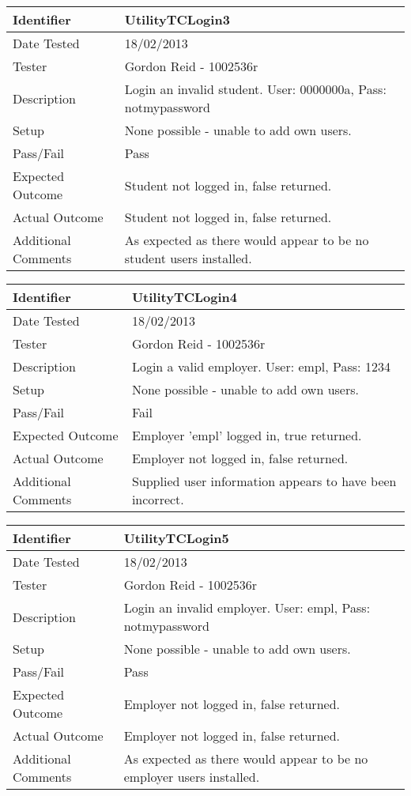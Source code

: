 \documentclass[11pt]{l3deliverable}
\begin{document}
\begin{tabularx}{\textwidth}{|T|L|}
\hline
Identifier & UtilityTCLogin3\\
\hline
Date Tested & 18/02/2013\\
\hline
Tester & Gordon Reid - 1002536r\\
\hline
Description & Login an invalid student. User: 0000000a, Pass: notmypassword\\
\hline
Setup & None possible - unable to add own users.\\
\hline
Pass/Fail & Pass\\
\hline
Expected Outcome & Student not logged in, false returned.\\
\hline
Actual Outcome & Student not logged in, false returned.\\
\hline
Additional Comments & As expected as there would appear to be no student users installed.\\
\hline
\end{tabularx}

\vspace{2em}

\begin{tabularx}{\textwidth}{|T|L|}
\hline
Identifier & UtilityTCLogin4\\
\hline
Date Tested & 18/02/2013\\
\hline
Tester & Gordon Reid - 1002536r\\
\hline
Description & Login a valid employer. User: empl, Pass: 1234\\
\hline
Setup & None possible - unable to add own users.\\
\hline
Pass/Fail & Fail\\
\hline
Expected Outcome & Employer 'empl' logged in, true returned.\\
\hline
Actual Outcome & Employer not logged in, false returned.\\
\hline
Additional Comments & Supplied user information appears to have been incorrect.\\
\hline
\end{tabularx}

\vspace{2em}

\begin{tabularx}{\textwidth}{|T|L|}
\hline
Identifier & UtilityTCLogin5\\
\hline
Date Tested & 18/02/2013\\
\hline
Tester & Gordon Reid - 1002536r\\
\hline
Description & Login an invalid employer. User: empl, Pass: notmypassword\\
\hline
Setup & None possible - unable to add own users.\\
\hline
Pass/Fail & Pass\\
\hline
Expected Outcome & Employer not logged in, false returned.\\
\hline
Actual Outcome & Employer not logged in, false returned.\\
\hline
Additional Comments & As expected as there would appear to be no employer users installed.\\
\hline
\end{tabularx}
\end{document}
